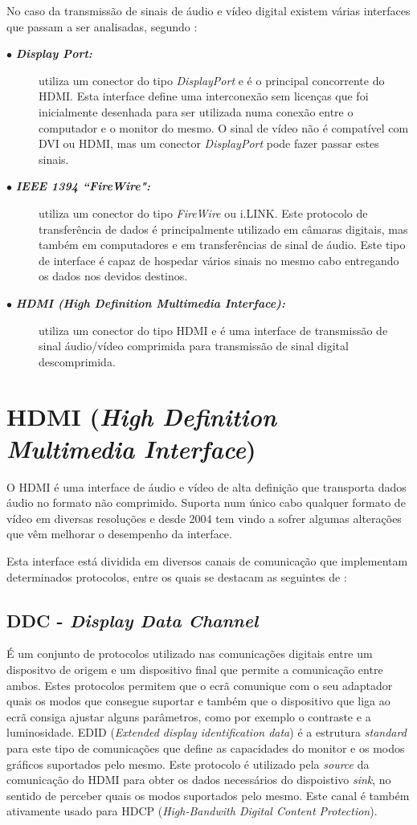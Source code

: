 No caso da transmissão de sinais de áudio e vídeo digital existem várias interfaces que passam a ser analisadas, segundo \cite{R004}:
\begin{description}
	\item[$\bullet$  \textbf{\textit{Display Port:}}] utiliza um conector do tipo \textit{DisplayPort} e é o principal concorrente do HDMI. Esta interface define uma interconexão sem licenças que foi inicialmente desenhada para ser utilizada numa conexão entre o computador e o monitor do mesmo. O sinal de vídeo não é compatível com DVI ou HDMI, mas um conector \textit{DisplayPort} pode fazer passar estes sinais.
	\item[$\bullet$   \textbf{\textit{ IEEE 1394 “FireWire":}}] utiliza um conector do tipo \textit{FireWire} ou i.LINK. Este protocolo de transferência de dados é principalmente utilizado em câmaras digitais, mas também em computadores e em transferências de sinal de áudio. Este tipo de interface é capaz de hospedar vários sinais no mesmo cabo entregando os dados nos devidos destinos.
	\item[$\bullet$   \textbf{\textit{HDMI (High Definition Multimedia Interface):}}]utiliza um conector do tipo HDMI e é uma interface de transmissão de sinal áudio/vídeo comprimida para transmissão de sinal digital descomprimida. 
\end{description}

\section{HDMI (\textit{High Definition Multimedia Interface})}\label{sec:dialecto}
O HDMI é uma interface de áudio e vídeo de alta definição que transporta dados áudio no formato não comprimido. Suporta num único cabo qualquer formato de vídeo em diversas resoluções e desde 2004 tem vindo a sofrer algumas alterações que vêm melhorar o desempenho da interface. 

Esta interface está dividida em diversos canais de comunicação que implementam determinados protocolos, entre os quais se destacam as seguintes de \cite{R002}:
\subsection{DDC - \textit{Display Data Channel} } \label{batik} 
É um conjunto de protocolos utilizado nas comunicações digitais entre um dispositvo de origem e um dispositivo final que permite a comunicação entre ambos. Estes protocolos permitem que o ecrã comunique com o seu adaptador quais os modos que consegue suportar e também que o dispositivo que liga ao ecrã consiga ajustar alguns parâmetros, como por exemplo o contraste e a luminosidade. EDID (\textit{Extended display identification data}) é a estrutura \textit{standard} para este tipo de comunicações que define as capacidades do monitor e os modos gráficos suportados pelo mesmo.  Este protocolo é utilizado pela \textit{source} da comunicação do HDMI para obter os dados necessários do dispoistivo \textit{sink}, no sentido de perceber quais os modos suportados pelo mesmo. Este canal é também ativamente usado para HDCP (\textit{High-Bandwith Digital Content Protection}).

